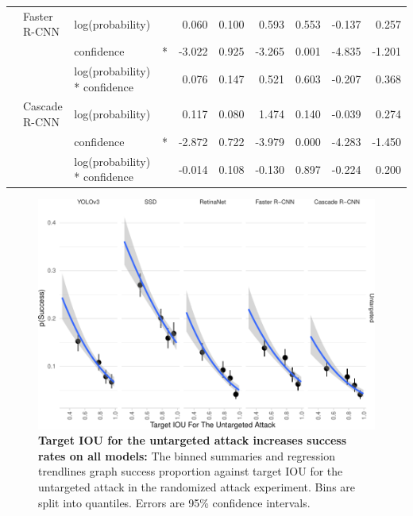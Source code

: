 \begin{longtable}[t]{llllrrrrrr}
\cmidrule{2-10}\nopagebreak
\hspace{1em} & Faster R-CNN & log(probability) &  & 0.060 & 0.100 & 0.593 & 0.553 & -0.137 & 0.257\\
\cmidrule{3-10}\nopagebreak
\hspace{1em} &  & confidence & * & -3.022 & 0.925 & -3.265 & 0.001 & -4.835 & -1.201\\
\cmidrule{3-10}\nopagebreak
\hspace{1em} &  & log(probability) * confidence &  & 0.076 & 0.147 & 0.521 & 0.603 & -0.207 & 0.368\\
\cmidrule{2-10}\nopagebreak
\hspace{1em} & Cascade R-CNN & log(probability) &  & 0.117 & 0.080 & 1.474 & 0.140 & -0.039 & 0.274\\
\cmidrule{3-10}\nopagebreak
\hspace{1em} &  & confidence & * & -2.872 & 0.722 & -3.979 & 0.000 & -4.283 & -1.450\\
\cmidrule{3-10}\nopagebreak
\hspace{1em} &  & log(probability) * confidence &  & -0.014 & 0.108 & -0.130 & 0.897 & -0.224 & 0.200\\
\bottomrule
\end{longtable}
\endgroup{}

\begin{figure}[tb]

{\centering \includegraphics{rmd_imgs/untarget_iou_graph-1} 

}

\caption{\textbf{Target IOU for the untargeted attack increases success rates on all models:}  The binned summaries and regression trendlines graph success proportion against target IOU for the untargeted attack in the randomized attack experiment. Bins are split into quantiles. Errors are 95\% confidence intervals. }\label{fig:untarget_iou_graph}
\end{figure}

